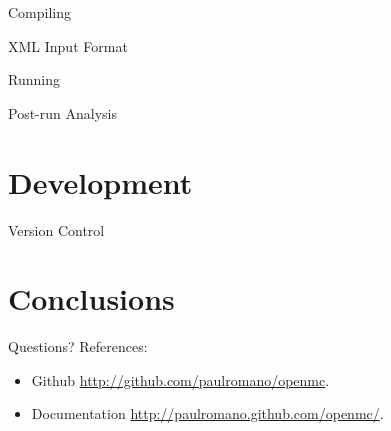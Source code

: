 \documentclass{beamer}
\begin{document}
\begin{frame}{Compiling}
\end{frame}

\begin{frame}{XML Input Format}
\end{frame}

\begin{frame}{Running}
\end{frame}

\begin{frame}{Post-run Analysis}
\end{frame}

\section{Development}

\begin{frame}{Version Control}
\end{frame}

\section{Conclusions}
\begin{frame}{Questions?}
  References:
  \begin{itemize}
    \item Github \url{http://github.com/paulromano/openmc}.
    \item Documentation \url{http://paulromano.github.com/openmc/}.
  \end{itemize}
\end{frame}
\end{document}

